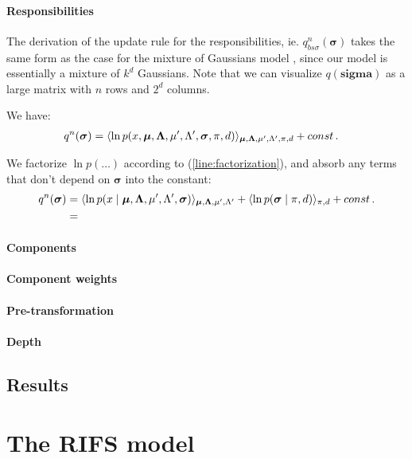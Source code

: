 \documentclass[10pt,a4paper,oneside]{article}
\theoremstyle{definition}
\newcommand{\p}{\mbox{\,.}}
\newcommand{\bD}{\boldsymbol\Lambda}
\newcommand{\bm}{\boldsymbol\mu}
\newcommand{\bs}[1]{{\boldsymbol {#1} }}
\begin{document}
\paragraph{Responsibilities}

The derivation of the update rule for the responsibilities, ie. $q_{bs{\sigma}}^{n}(\bs{\sigma})$ takes the same form as the case for the mixture of Gaussians model \cite{}, since our model is essentially a mixture of $k^d$ Gaussians. Note that we can visualize $q(\bs{sigma})$ as a large matrix with $n$ rows and $2^d$ columns.

We have:
\begin{align*}
q^n(\bs{\sigma}) &= \langle \ln p(x, \bm, \bD, \mu', \Lambda', \bs{\sigma}, \pi, d) \rangle_{\bm, \bD, \mu', \Lambda', \pi, d} + const \p
\end{align*}

We factorize $\ln p(\ldots)$ according to (\ref{line:factorization}), and absorb any terms that don't depend on $\bs{\sigma}$ into the constant:   
\begin{align*}
q^n(\bs{\sigma}) &= \langle \ln p(x \mid \bm, \bD, \mu', \Lambda', \bs{\sigma}) \rangle_{\bm, \bD, \mu', \Lambda'} +  \langle \ln p(\bs{\sigma} \mid \pi, d) \rangle_{\pi, d} + const \p\\
& = 
\end{align*}


\paragraph{Components}

\paragraph{Component weights}

\paragraph{Pre-transformation}

\paragraph{Depth}


\subsection{Results}

\section{The RIFS model}
\end{document}
